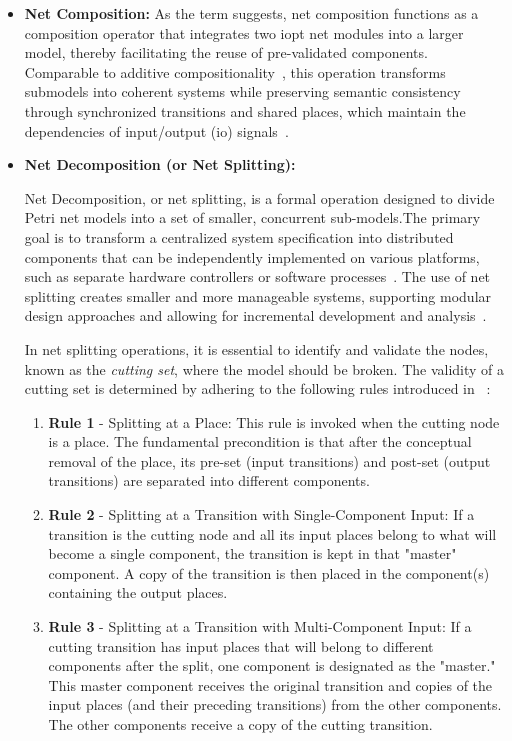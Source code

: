 \begin{itemize}
    \item \textbf{Net Composition: }     
As the term suggests, net composition functions as a composition operator that integrates two \gls{iopt} net modules into a larger model, thereby facilitating the reuse of pre-validated components. Comparable to additive compositionality~\cite{add2}, this operation transforms submodels into coherent systems while preserving semantic consistency through synchronized transitions and shared places, which maintain the dependencies of input/output (\gls{io}) signals~\cite{add1}.
\end{itemize}

\begin{itemize}
    \item \textbf{Net Decomposition (or Net Splitting): }     
    
Net Decomposition, or net splitting,  is a formal operation designed to divide Petri net models into a set of smaller, concurrent sub-models.The primary goal is to transform a centralized system specification into distributed components that can be independently implemented on various platforms, such as separate hardware controllers or software processes~\cite{co-design}. The use of net splitting creates smaller and more manageable systems, supporting modular design approaches and allowing for incremental development and analysis~\cite{Barrosadd}.

In net splitting operations, it is essential to identify and validate the nodes, known as the \emph{cutting set}, where the model should be broken. The validity of a cutting set is determined by adhering to the following rules introduced in ~\cite{splitting}:

\begin{enumerate}
    \item \textbf{Rule 1} - Splitting at a Place: This rule is invoked when the cutting node is a place. The fundamental precondition is that after the conceptual removal of the place, its pre-set (input transitions) and post-set (output transitions) are separated into different components.
    \item \textbf{Rule 2} - Splitting at a Transition with Single-Component Input: If a transition is the cutting node and all its input places belong to what will become a single component, the transition is kept in that "master" component. A copy of the transition is then placed in the component(s) containing the output places.
    \item\textbf{ Rule 3} - Splitting at a Transition with Multi-Component Input: If a cutting transition has input places that will belong to different components after the split, one component is designated as the "master." This master component receives the original transition and copies of the input places (and their preceding transitions) from the other components. The other components receive a copy of the cutting transition.
\end{enumerate}


\end{itemize}
